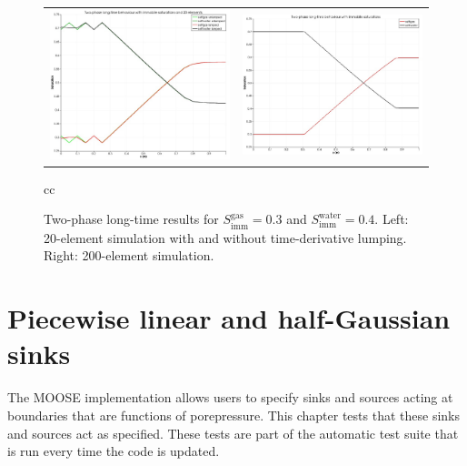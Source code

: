 \documentclass[]{scrreprt}
\begin{document}
\begin{figure}[htb]
\centering
\begin{tabular}{cc}
\includegraphics[width=8cm]{gh2_20.eps} &
\includegraphics[width=8cm]{gh2.eps}
\end{tabular}{cc}
\caption{Two-phase long-time results for
  $S^{\mathrm{gas}}_{\mathrm{imm}}=0.3$ and
  $S^{\mathrm{water}}_{\mathrm{imm}}=0.4$.  Left: 20-element
  simulation with and without time-derivative lumping.  Right: 200-element simulation.}
\label{gh2.fig}
\end{figure}


\chapter{Piecewise linear and half-Gaussian sinks}
\label{si}

The MOOSE implementation allows users to specify sinks and sources
acting at boundaries that are functions of porepressure.  This chapter
tests that these sinks and sources act as specified.  These tests are
part of the automatic test suite that is run every time the code is
updated.
\end{document}
